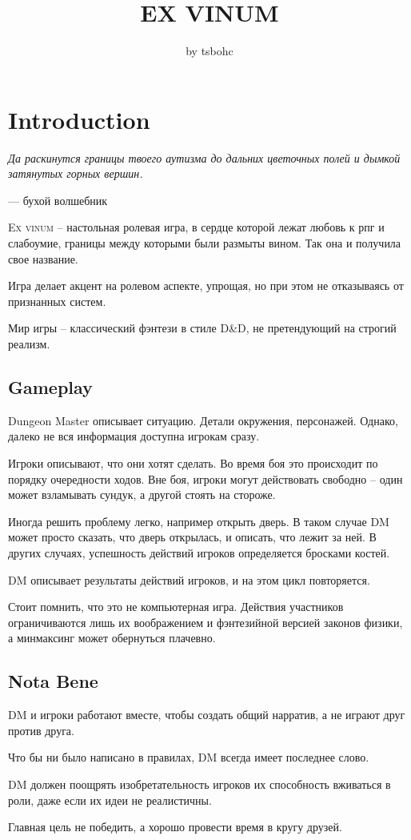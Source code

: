 \documentclass[a5paper,11pt]{book}
\title{\textbf{EX VINUM}}
\author{by tsbohc}
\date{}
\begin{document}
\maketitle
\tableofcontents
\pagebreak


\chapter{Introduction}
\begin{multicols}{2}
\epigraph{\emph{Да раскинутся границы твоего аутизма до дальних цветочных полей и дымкой затянутых горных вершин.}}{--- бухой волшебник}

\lettrine{E}{x vinum} -- настольная ролевая игра, в сердце которой лежат любовь к рпг и слабоумие, границы между которыми были размыты вином. Так она и получила свое название.

Игра делает акцент на ролевом аспекте, упрощая, но при этом не отказываясь от признанных систем.

Мир игры -- классический фэнтези в стиле D\&D, не претендующий на строгий реализм.

\section{Gameplay}
Dungeon Master описывает ситуацию. Детали окружения, персонажей. Однако, далеко не вся информация доступна игрокам сразу.

Игроки описывают, что они хотят сделать. Во время боя это происходит по порядку очередности ходов. Вне боя, игроки могут действовать свободно -- один может взламывать сундук, а другой стоять на стороже.

Иногда решить проблему легко, например открыть дверь. В таком случае DM может просто сказать, что дверь открылась, и описать, что лежит за ней. В других случаях, успешность действий игроков определяется бросками костей.

DM описывает результаты действий игроков, и на этом цикл повторяется.

Стоит помнить, что это не компьютерная игра. Действия участников ограничиваются лишь их воображением и фэнтезийной версией законов физики, а минмаксинг может обернуться плачевно.

\section{Nota Bene}
DM и игроки работают вместе, чтобы создать общий нарратив, а не играют друг против друга.

Что бы ни было написано в правилах, DM всегда имеет последнее слово.

DM должен поощрять изобретательность игроков их способность вживаться в роли, даже если их идеи не реалистичны.

Главная цель не победить, а хорошо провести время в кругу друзей.


\end{multicols}
\end{document}
